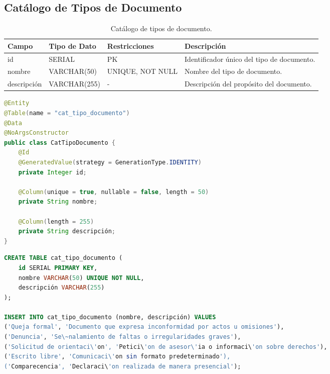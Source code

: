 \subsection{Cat\'alogo de Tipos de Documento}

\begin{table}[H]
\centering
\small
\begin{tabularx}{\textwidth}{|l|l|l|X|}
\hline
\rowcolor{azulESCOM} 
\color{white}\textbf{Campo} & \color{white}\textbf{Tipo de Dato} & \color{white}\textbf{Restricciones} & \color{white}\textbf{Descripci\'on} \\ \hline
id & SERIAL & PK & Identificador \'unico del tipo de documento. \\ \hline
nombre & VARCHAR(50) & UNIQUE, NOT NULL & Nombre del tipo de documento. \\ \hline
descripción & VARCHAR(255) & - & Descripci\'on del prop\'osito del documento. \\ \hline
\end{tabularx}
\caption{Cat\'alogo de tipos de documento.}
\label{tab:dict_cat_tipo_doc}
\end{table}

\begin{lstlisting}[language=Java, caption={Entidad Java para cat\'alogo de tipos de documento.}, label={lst:java_cat_tipo_doc}]
@Entity
@Table(name = "cat_tipo_documento")
@Data
@NoArgsConstructor
public class CatTipoDocumento {
    @Id
    @GeneratedValue(strategy = GenerationType.IDENTITY)
    private Integer id;
    
    @Column(unique = true, nullable = false, length = 50)
    private String nombre;
    
    @Column(length = 255)
    private String descripción;
}
\end{lstlisting}

\begin{lstlisting}[language=SQL, caption={Script de creaci\'on e inicializaci\'on del cat\'alogo de tipos de documento.}, label={lst:sql_cat_tipo_doc}]
CREATE TABLE cat_tipo_documento (
    id SERIAL PRIMARY KEY,
    nombre VARCHAR(50) UNIQUE NOT NULL,
    descripción VARCHAR(255)
);

INSERT INTO cat_tipo_documento (nombre, descripción) VALUES 
('Queja formal', 'Documento que expresa inconformidad por actos u omisiones'),
('Denuncia', 'Se\~nalamiento de faltas o irregularidades graves'),
('Solicitud de orientaci\'on', 'Petici\'on de asesor\'ia o informaci\'on sobre derechos'),
('Escrito libre', 'Comunicaci\'on sin formato predeterminado'),
('Comparecencia', 'Declaraci\'on realizada de manera presencial');
\end{lstlisting}

